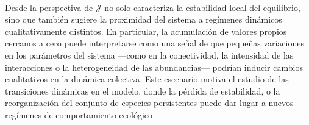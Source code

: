 \\
Desde la perspectiva de $\mathcal{J}$ no solo caracteriza la estabilidad local del equilibrio, sino que también sugiere la proximidad del sistema a regímenes dinámicos cualitativamente distintos. En particular, la acumulación de valores propios cercanos a cero puede interpretarse como una señal de que pequeñas variaciones en los parámetros del sistema ---como en la conectividad, la intensidad de las interacciones o la heterogeneidad de las abundancias--- podrían inducir cambios cualitativos en la dinámica colectiva. Este escenario motiva el estudio de las transiciones dinámicas en el modelo, donde la pérdida de estabilidad, o la reorganización del conjunto de especies persistentes puede dar lugar a nuevos regímenes de comportamiento ecológico

